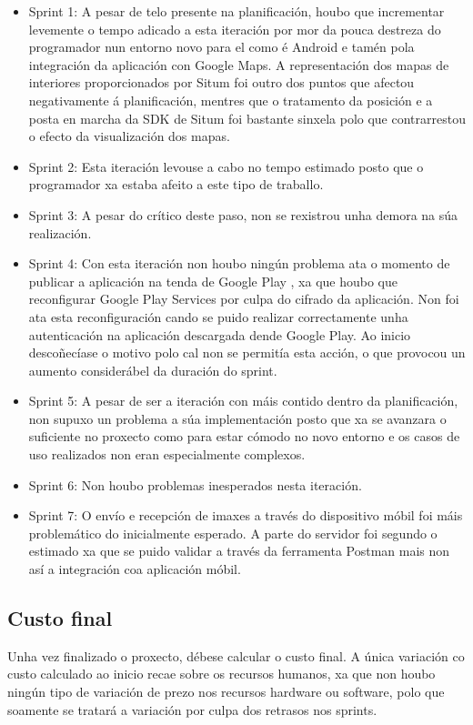 \begin{itemize}
	\item Sprint 1: A pesar de telo presente na planificación, houbo que incrementar levemente o tempo adicado a esta iteración por mor da pouca destreza do programador nun entorno novo para el como é Android e tamén pola integración da aplicación con Google Maps. A representación dos mapas de interiores proporcionados por Situm foi outro dos puntos que afectou negativamente á planificación, mentres que o tratamento da posición e a posta en marcha da SDK de Situm foi bastante sinxela polo que contrarrestou o efecto da visualización dos mapas.
	\item Sprint 2: Esta iteración levouse a cabo no tempo estimado posto que o programador xa estaba afeito a este tipo de traballo.
	\item Sprint 3: A pesar do crítico deste paso, non se rexistrou unha demora na súa realización.
	\item Sprint 4: Con esta iteración non houbo ningún problema ata o momento de publicar a aplicación na tenda de Google Play \cite{googlePlayStore}, xa que houbo que reconfigurar Google Play Services por culpa do cifrado da aplicación. Non foi ata esta reconfiguración cando se puido realizar correctamente unha autenticación na aplicación descargada dende Google Play. Ao inicio descoñecíase o motivo polo cal non se permitía esta acción, o que provocou un aumento considerábel da duración do sprint.
	\item Sprint 5: A pesar de ser a iteración con máis contido dentro da planificación, non supuxo un problema a súa implementación posto que xa se avanzara o suficiente no proxecto como para estar cómodo no novo entorno e os casos de uso realizados non eran especialmente complexos.
	\item Sprint 6: Non houbo problemas inesperados nesta iteración.
	\item Sprint 7: O envío e recepción de imaxes a través do dispositivo móbil foi máis problemático do inicialmente esperado. A parte do servidor foi segundo o estimado xa que se puido validar a través da ferramenta Postman mais non así a integración coa aplicación móbil.
\end{itemize}

\subsection{Custo final}
Unha vez finalizado o proxecto, débese calcular o custo final. A única variación co custo calculado ao inicio recae sobre os recursos humanos, xa que non houbo ningún tipo de variación de prezo nos recursos hardware ou software, polo que soamente se tratará a variación por culpa dos retrasos nos sprints.

